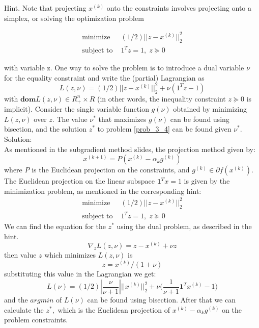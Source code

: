 \documentclass{article}
\begin{document}
Hint. Note that projecting $x^{(k)}$ onto the constraints involves projecting onto a
simplex, or solving the optimization problem

\begin{align}
	\text{minimize } &(1/2)||z - x^{(k)}||_2^2 \nonumber \\
	\text{subject to } & {1}^T z = 1, \;
	z \succeq 0 \label{prob_3_4}
\end{align} 

with variable z. One way to solve the problem is to introduce a dual variable $\nu$
for the equality constraint and write the (partial) Lagrangian as
$$
L(z, \nu) = (1/2)||z - x^{(k)}||_2^2 + \nu ({1}^T z - 1)
$$
with $\mathbf{dom} L(z, \nu) \in R^n_+ \times R$ (in other words, the 
inequality constraint $z \succeq 0 $
is implicit). Consider the single variable function
$g(\nu)$ obtained by minimizing
$L(z, \nu)$ over $z.$ The value $\nu^*$ that maximizes $g(\nu)$ 
can be found using bisection,
and the solution $z^*$ to problem \ref{prob_3_4} can be found given $\nu^*.$ \\

Solution:\\

As mentioned in the subgradient method slides, 
the projection method given by:
$$
x^{(k+1)} = P(x^{(k)} - \alpha_k g^{(k)})
$$
where $P$ is the Euclidean projection on the constraints, 
and $g^{(k)} \in \partial f(x^{(k)}).$
The  Euclidean projection on the linear subspace 
$\mathbf{1}^T x = 1$ is given by the minimization problem, as mentioned in the corresponding hint: 
\begin{align}
	\text{minimize } &(1/2)||z - x^{(k)}||_2^2 \nonumber \\
	\text{subject to } & {1}^T z = 1, \;
	z \succeq 0 
\end{align} 
We can find the equation for the $z^*$ using the dual problem, as described in the hint.
$$
\nabla_z L(z, \nu) = z - x^{(k)} + \nu z
$$
then value $z$ which minimizes $L(z, \nu)$ is
$$
z = x^{(k)} / (1 + \nu)
$$
substituting this value in the Lagrangian we get:
$$
L(\nu) = (1/2) \left|\frac{\nu}{\nu+1}\right| ||x^{(k)}||_2^2 + 
\nu \big(\frac{1}{\nu + 1} \mathbf{1}^T x^{(k)} - 1 \big) 
$$ 
and the $argmin$ of $L(\nu)$ can be found using bisection. After that we can calculate the $z^*,$ which is the Euclidean projection of $x^{(k)} - \alpha_k g^{(k)}$ on the problem constraints.
\end{document}
